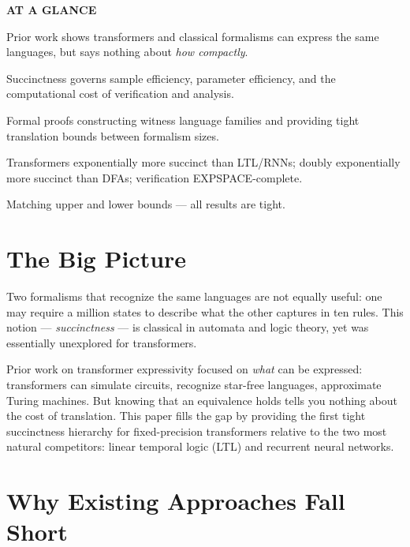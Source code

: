 \documentclass[10pt,twocolumn]{article}
\begin{document}
\begin{mdframed}[backgroundcolor=boxgray,linecolor=rulered,linewidth=1pt,
    innerleftmargin=6pt,innerrightmargin=6pt,
    innertopmargin=6pt,innerbottommargin=6pt]
\textbf{\small AT A GLANCE}\par\vspace{4pt}
\begin{description}[leftmargin=0pt,labelsep=4pt,itemsep=2pt,parsep=0pt,
    font=\small\bfseries]
  \item[Problem:] Prior work shows transformers and classical formalisms can
    express the same languages, but says nothing about \emph{how compactly}.
  \item[Why it matters:] Succinctness governs sample efficiency, parameter
    efficiency, and the computational cost of verification and analysis.
  \item[Method:] Formal proofs constructing witness language families and
    providing tight translation bounds between formalism sizes.
  \item[Result:] Transformers exponentially more succinct than LTL/RNNs;
    doubly exponentially more succinct than DFAs; verification EXPSPACE-complete.
  \item[Evidence:] Matching upper and lower bounds --- all results are tight.
\end{description}
\end{mdframed}

\section{The Big Picture}

Two formalisms that recognize the same languages are not equally useful: one
may require a million states to describe what the other captures in ten
rules. This notion --- \emph{succinctness} --- is classical in automata and
logic theory, yet was essentially unexplored for transformers.

Prior work on transformer expressivity focused on \emph{what} can be
expressed: transformers can simulate circuits, recognize star-free languages,
approximate Turing machines. But knowing that an equivalence holds tells
you nothing about the cost of translation. This paper fills the gap by
providing the first tight succinctness hierarchy for fixed-precision
transformers relative to the two most natural competitors: linear temporal
logic (LTL) and recurrent neural networks.

\section{Why Existing Approaches Fall Short}
\end{document}
